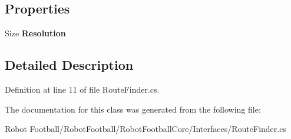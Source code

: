 \subsection*{Properties}
\begin{DoxyCompactItemize}
\item 
\hypertarget{class_robot_football_core_1_1_interfaces_1_1_route_finder_ad8be1975f5fbdc81d7c58417e917782c}{Size {\bfseries Resolution}}\label{class_robot_football_core_1_1_interfaces_1_1_route_finder_ad8be1975f5fbdc81d7c58417e917782c}

\end{DoxyCompactItemize}


\subsection{Detailed Description}


Definition at line 11 of file Route\-Finder.\-cs.



The documentation for this class was generated from the following file\-:\begin{DoxyCompactItemize}
\item 
Robot Football/\-Robot\-Football/\-Robot\-Football\-Core/\-Interfaces/Route\-Finder.\-cs\end{DoxyCompactItemize}
